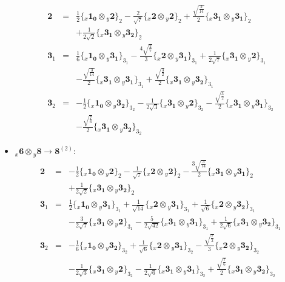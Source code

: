 \documentclass[english]{article}
\newcommand{\rep}[1]{\mathbf{#1}}
\newcommand{\repx}[2]{{}_{#2}\mathbf{#1}}
\newcommand{\subcg}[3]{\big\{ \repx{#1}{x}\otimes\repx{#2}{y}\big\}^{}_{#3}}
\begin{document}
\begin{itemize}
\begin{eqnarray*}
\rep{2} &=& \frac{1}{2}\subcg{1_{0}}{2}{2}-\frac{2}{\sqrt{7}}\subcg{2}{2}{2}+\frac{\sqrt{\frac{3}{14}}}{2}\subcg{3_{1}}{3_{1}}{2} \\ 
 & & +\frac{1}{2 \sqrt{2}}\subcg{3_{1}}{3_{2}}{2}
\\
\rep{3}_{1} &=& \frac{1}{6}\subcg{1_{0}}{3_{1}}{3_{1}}-\frac{4 \sqrt{\frac{2}{7}}}{3}\subcg{2}{3_{1}}{3_{1}}+\frac{1}{2 \sqrt{7}}\subcg{3_{1}}{2}{3_{1}} \\ 
 & & -\frac{\sqrt{\frac{3}{14}}}{2}\subcg{3_{1}}{3_{1}}{3_{1}}+\frac{\sqrt{\frac{3}{2}}}{2}\subcg{3_{1}}{3_{2}}{3_{1}}
\\
\rep{3}_{2} &=& -\frac{1}{2}\subcg{1_{0}}{3_{2}}{3_{2}}-\frac{1}{2 \sqrt{3}}\subcg{3_{1}}{2}{3_{2}}-\frac{\sqrt{\frac{3}{2}}}{2}\subcg{3_{1}}{3_{1}}{3_{2}} \\ 
 & & -\frac{\sqrt{\frac{7}{6}}}{2}\subcg{3_{1}}{3_{2}}{3_{2}}
\end{eqnarray*}
\item $\repx{6}{x}\otimes\repx{8}{y}\to\rep{8}^{(2)}$:
\begin{eqnarray*}
\rep{2} &=& -\frac{1}{2}\subcg{1_{0}}{2}{2}-\frac{1}{\sqrt{7}}\subcg{2}{2}{2}-\frac{3 \sqrt{\frac{3}{14}}}{2}\subcg{3_{1}}{3_{1}}{2} \\ 
 & & +\frac{1}{2 \sqrt{2}}\subcg{3_{1}}{3_{2}}{2}
\\
\rep{3}_{1} &=& \frac{1}{2}\subcg{1_{0}}{3_{1}}{3_{1}}+\frac{1}{\sqrt{14}}\subcg{2}{3_{1}}{3_{1}}+\frac{1}{\sqrt{6}}\subcg{2}{3_{2}}{3_{1}} \\ 
 & & -\frac{3}{2 \sqrt{7}}\subcg{3_{1}}{2}{3_{1}}-\frac{5}{2 \sqrt{42}}\subcg{3_{1}}{3_{1}}{3_{1}}+\frac{1}{2 \sqrt{6}}\subcg{3_{1}}{3_{2}}{3_{1}}
\\
\rep{3}_{2} &=& -\frac{1}{6}\subcg{1_{0}}{3_{2}}{3_{2}}+\frac{1}{\sqrt{6}}\subcg{2}{3_{1}}{3_{2}}-\frac{\sqrt{\frac{7}{2}}}{3}\subcg{2}{3_{2}}{3_{2}} \\ 
 & & -\frac{1}{2 \sqrt{3}}\subcg{3_{1}}{2}{3_{2}}-\frac{1}{2 \sqrt{6}}\subcg{3_{1}}{3_{1}}{3_{2}}+\frac{\sqrt{\frac{7}{6}}}{2}\subcg{3_{1}}{3_{2}}{3_{2}}
\end{eqnarray*}
\end{itemize}
\end{document}
